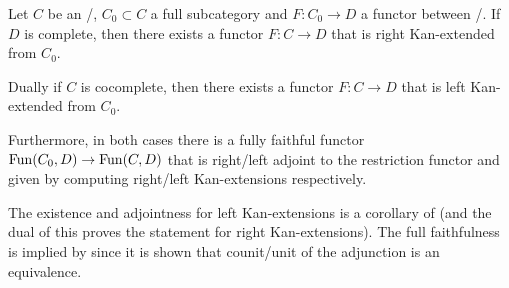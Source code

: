 \begin{prop}\label{prop:exKanExt}
    Let $C$ be an \inftycat/, $C_0\subset C$ a full subcategory and $F\colon C_0\to D$ a functor between \inftycats/.
    If $D$ is complete, then there exists a functor $F\colon C\to D$ that is right Kan-extended from $C_0$.

    Dually if $C$ is cocomplete, then there exists a functor $F\colon C\to D$ that is left Kan-extended from $C_0$.
    
    Furthermore, in both cases there is a fully faithful functor $\operatorname{Fun}(C_0,D)\to\operatorname{Fun}(C,D)$ that is right/left adjoint to the restriction functor and given by computing right/left Kan-extensions respectively.
    \begin{reference}%
        The existence and adjointness for left Kan-extensions is a corollary of \cite[Corollary 7.3.6.4]{kerodon} (and the dual of this proves the statement for right Kan-extensions).
        The full faithfulness is implied by \cite[Corollary 7.3.1.16]{kerodon} since it is shown that counit/unit of the adjunction is an equivalence.
    \end{reference}
\end{prop}
